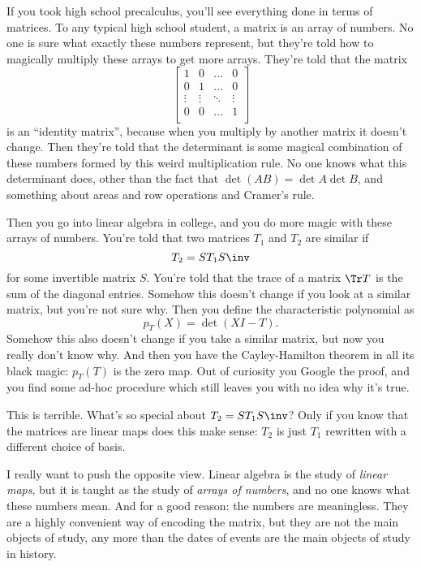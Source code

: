 If you took high school precalculus, you'll see everything done in terms of matrices.
To any typical high school student, a matrix is an array of numbers.
No one is sure what exactly these numbers represent,
but they're told how to magically multiply these arrays to get more arrays.
They're told that the matrix
\[ \begin{bmatrix}
		1 & 0 & \dots & 0 \\
		0 & 1 & \dots & 0 \\
		\vdots & \vdots & \ddots & \vdots \\
		0 & 0 & \dots & 1 \\
	\end{bmatrix} \]
is an ``identity matrix'', because when you multiply
by another matrix it doesn't change.
Then they're told that the determinant is some magical combination of these
numbers formed by this weird multiplication rule.
No one knows what this determinant does,
other than the fact that $\det(AB) = \det A \det B$,
and something about areas and row operations and Cramer's rule.

Then you go into linear algebra in college, and you do more magic
with these arrays of numbers.
You're told that two matrices $T_1$ and $T_2$ are similar if
\[ T_2 = ST_1S\inv \] for some invertible matrix $S$.
You're told that the trace of a matrix $\Tr T$ is the sum of the diagonal entries.
Somehow this doesn't change if you look at a similar matrix,
but you're not sure why.
Then you define the characteristic polynomial as
\[ p_T(X) = \det (XI - T). \]
Somehow this also doesn't change if you take a similar matrix,
but now you really don't know why.
And then you have the Cayley-Hamilton theorem in all its black magic:
$p_T(T)$ is the zero map.  Out of curiosity you Google the proof,
and you find some ad-hoc procedure which still leaves you
with no idea why it's true.

This is terrible. What's so special about $T_2 = ST_1S\inv$?
Only if you know that the matrices are linear maps does this make sense:
$T_2$ is just $T_1$ rewritten with a different choice of basis.

I really want to push the opposite view.
Linear algebra is the study of \emph{linear maps},
but it is taught as the study of \emph{arrays of numbers},
and no one knows what these numbers mean.
And for a good reason: the numbers are meaningless.
They are a highly convenient way of encoding the matrix,
but they are not the main objects of study,
any more than the dates of events are the main objects of study in history.

